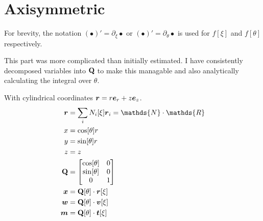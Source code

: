 \documentclass[a4paper,11pt]{article}
\renewcommand{\to}[1]{\text{\boldmath $#1$}} %
\newcommand{\ts}[1]{\text{\boldmath $\mathrm{#1}$}} %
\newcommand{\uv}[1]{\mathds{#1}}
\newcommand{\um}[1]{\mathds{#1}}
\newcommand{\pderiv}[2]{\partial_{#2} #1}
\begin{document}
\section{Axisymmetric}
For brevity, the notation $(\bullet)' = \pderiv{\bullet}{\xi}$ or $(\bullet)' = \pderiv{\bullet}{\theta}$ is used for $f[\xi]$ and $f[\theta]$ respectively.

This part was more complicated than initially estimated.
I have consistently decomposed variables into $\ts Q$ to make this managable and also analytically calculating the integral over $\theta$.

With cylindrical coordinates $\to r = r\to e_r + z \to e_z$.
\begin{align}
 \to r &= \sum_i N_i[\xi]\to r_i = \um N\cdot \uv R\\
 x &= \cos[\theta] r\\
 y &= \sin[\theta] r\\
 z &= z\\
 \ts Q &= \begin{bmatrix}\cos[\theta] & 0\\ \sin[\theta] & 0\\ 0 & 1\end{bmatrix}\\
 \to x &= \ts Q[\theta] \cdot \to r[\xi]\\
 \to w &= \ts Q[\theta] \cdot \to v[\xi]\\
 \to m &= \ts Q[\theta] \cdot \to t[\xi]
\end{align}
\end{document}
